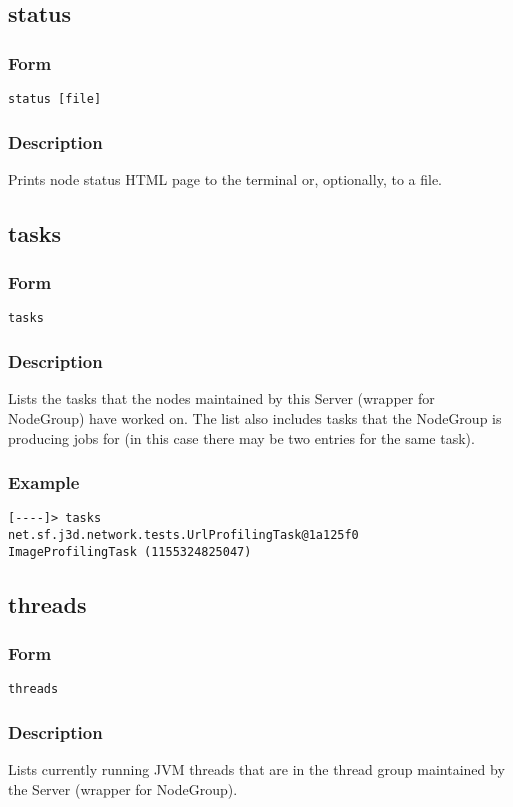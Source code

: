 \documentclass[12pt]{article}
\begin{document}
\subsection{status}
\subsubsection{Form}
\begin{verbatim}
status [file]
\end{verbatim}
\subsubsection{Description}
Prints node status HTML page to the terminal or, optionally, to a file.

\subsection{tasks}
\subsubsection{Form}
\begin{verbatim}
tasks
\end{verbatim}
\subsubsection{Description}
Lists the tasks that the nodes maintained by this Server (wrapper for NodeGroup) have worked on. The list also includes tasks that the NodeGroup is producing jobs for (in this case there may be two entries for the same task).
\subsubsection{Example}
\begin{verbatim}
[----]> tasks
net.sf.j3d.network.tests.UrlProfilingTask@1a125f0
ImageProfilingTask (1155324825047)
\end{verbatim}

\subsection{threads}
\subsubsection{Form}
\begin{verbatim}
threads
\end{verbatim}
\subsubsection{Description}
Lists currently running JVM threads that are in the thread group maintained by the Server (wrapper for NodeGroup).
\end{document}
